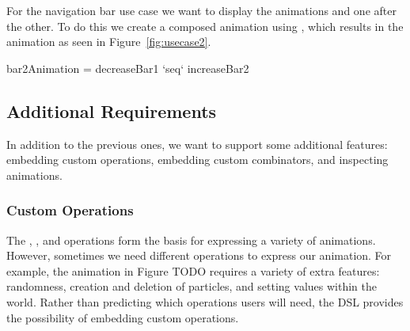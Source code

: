 For the navigation bar use case we want to display the animations  and  one after the other. To do this we create a composed animation using , which results in the animation as seen in Figure~\ref{fig:usecase2}.

\begin{spec}
bar2Animation = decreaseBar1 `seq` increaseBar2
\end{spec}

\subsection{Additional Requirements}

In addition to the previous ones, we want to support some additional features: embedding custom operations, embedding custom combinators, and inspecting animations.

\subsubsection{Custom Operations}

The , , and  operations form the basis for expressing a variety of animations. However, sometimes we need different operations to express our animation. For example, the animation in Figure TODO requires a variety of extra features: randomness, creation and deletion of particles, and setting values within the world. Rather than predicting which operations users will need, the DSL provides the possibility of embedding custom operations.








